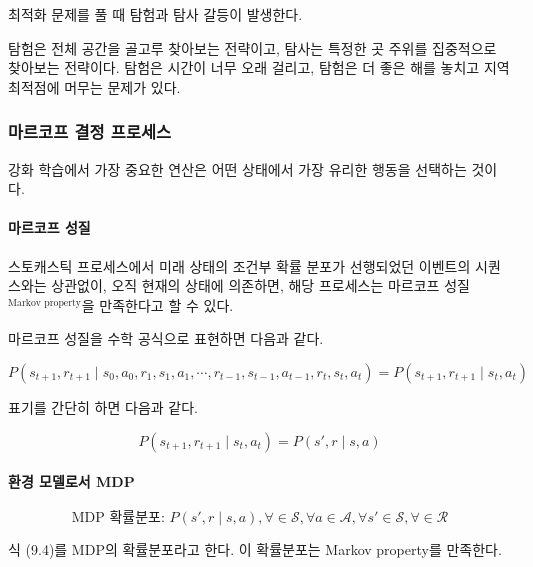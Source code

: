 \documentclass [12pt] {oblivoir}
\let\oldsubsubsection=\subsubsection
\renewcommand{\subsubsection}
{
  \filbreak
  \oldsubsubsection
}
\begin{document}
최적화 문제를 풀 때 탐험과 탐사 갈등이 발생한다.

탐험은 전체 공간을 골고루 찾아보는 전략이고, 탐사는 특정한 곳 주위를 집중적으로 찾아보는 전략이다. 탐험은 시간이 너무 오래 걸리고, 탐험은 더 좋은 해를 놓치고 지역 최적점에 머무는 문제가 있다.

\subsubsection{마르코프 결정 프로세스}

강화 학습에서 가장 중요한 연산은 어떤 상태에서 가장 유리한 행동을 선택하는 것이다.

\paragraph*{마르코프 성질}\mbox{}

스토캐스틱 프로세스에서 미래 상태의 조건부 확률 분포가 선행되었던 이벤트의 시퀀스와는 상관없이, 오직 현재의 상태에 의존하면, 해당 프로세스는 마르코프 성질$^{\text{Markov property}}$을 만족한다고 할 수 있다.

마르코프 성질을 수학 공식으로 표현하면 다음과 같다.

\begin{equation} \tag{9.2}
  P(s_{t+1}, r_{t+1} \mid s_{0}, a_{0}, r_{1}, s_{1}, a_{1}, \cdots, r_{t-1}, s_{t-1}, a_{t-1}, r_{t}, s_{t}, a_{t}) = P(s_{t+1}, r_{t+1} \mid s_{t}, a_{t})
\end{equation}

표기를 간단히 하면 다음과 같다.

\begin{equation} \tag{9.3}
  P(s_{t+1}, r_{t+1} \mid s_{t}, a_{t}) = P(s', r \mid s, a)
\end{equation}

\vspace{3mm}

\paragraph*{환경 모델로서 MDP}\mbox{}

\begin{equation} \tag{9.4}
  \text{MDP 확률분포: } P(s',r \mid s, a), \forall \in \mathcal{S}, \forall a \in \mathcal{A}, \forall s' \in \mathcal{S}, \forall \in \mathcal{R}
\end{equation}

식 (9.4)를 MDP의 확률분포라고 한다. 이 확률분포는 Markov property를 만족한다.
\end{document}
